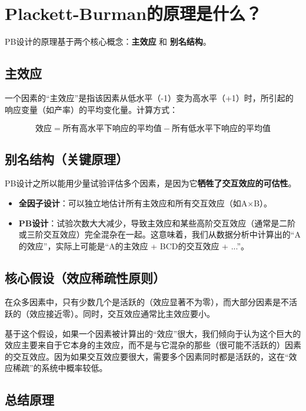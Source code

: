 \documentclass[fontset=windows,12pt]{ctexart}
\begin{document}
\section{Plackett-Burman的原理是什么？}

PB设计的原理基于两个核心概念：\textbf{主效应} 和 \textbf{别名结构}。

\subsection{主效应}

一个因素的“主效应”是指该因素从低水平（-1）变为高水平（+1）时，所引起的响应变量（如产率）的平均变化量。计算方式：

\[\text{效应} = \text{所有高水平下响应的平均值} - \text{所有低水平下响应的平均值}\]

\subsection{别名结构（关键原理）}

PB设计之所以能用少量试验评估多个因素，是因为它\textbf{牺牲了交互效应的可估性}。

\begin{itemize}
	\item \textbf{全因子设计}：可以独立地估计所有主效应和所有交互效应（如A×B）。
	\item \textbf{PB设计}：试验次数大大减少，导致主效应和某些高阶交互效应（通常是二阶或三阶交互效应）完全混杂在一起。这意味着，我们从数据分析中计算出的“A的效应”，实际上可能是“A的主效应 + BCD的交互效应 + ...”。
\end{itemize}
	
\subsection{核心假设（效应稀疏性原则）}

在众多因素中，只有少数几个是活跃的（效应显著不为零），而大部分因素是不活跃的（效应接近零）。同时，交互效应通常比主效应要小。

基于这个假设，如果一个因素被计算出的“效应”很大，我们倾向于认为这个巨大的效应主要来自于它本身的主效应，而不是与它混杂的那些（很可能不活跃的）因素的交互效应。因为如果交互效应要很大，需要多个因素同时都是活跃的，这在“效应稀疏”的系统中概率较低。

\subsection{总结原理}
\end{document}
